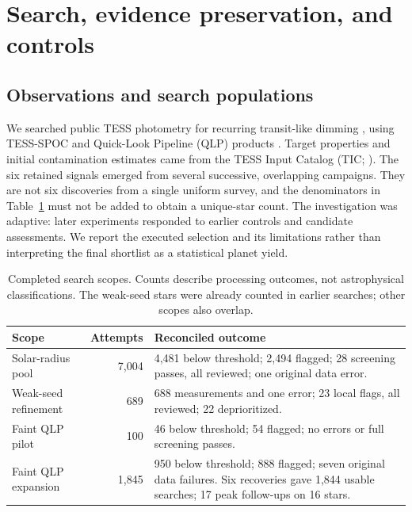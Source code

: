 \section{Search, evidence preservation, and controls}
\label{sec:methods}

\subsection{Observations and search populations}

We searched public TESS photometry for recurring transit-like dimming
\cite{ricker2015}, using TESS-SPOC and Quick-Look Pipeline (QLP) products
\cite{caldwell2020,huang2020}. Target properties and initial contamination
estimates came from the TESS Input Catalog (TIC; \cite{tic2019}). The six
retained signals emerged from several successive, overlapping campaigns.
They are not six discoveries from a single uniform survey, and the denominators
in Table~\ref{tab:campaigns} must not be added to obtain a unique-star count.
The investigation was adaptive: later experiments responded to earlier
controls and candidate assessments. We report the executed selection and
its limitations rather than interpreting the final shortlist as a statistical
planet yield.

\begin{table}[htbp]
\centering
\small
\caption{Completed search scopes. Counts describe processing outcomes,
not astrophysical classifications. The weak-seed stars were already counted
in earlier searches; other scopes also overlap.}
\label{tab:campaigns}
\begin{tabularx}{\linewidth}{@{}l r X@{}}
\toprule
Scope & Attempts & Reconciled outcome \\
\midrule
Solar-radius pool & 7,004 & 4,481 below threshold; 2,494 flagged;
28 screening passes, all reviewed; one original data error. \\
Weak-seed refinement & 689 & 688 measurements and one error;
23 local flags, all reviewed; 22 deprioritized. \\
Faint QLP pilot & 100 & 46 below threshold; 54 flagged; no errors
or full screening passes. \\
Faint QLP expansion & 1,845 & 950 below threshold; 888 flagged;
seven original data failures. Six recoveries gave 1,844 usable searches;
17 peak follow-ups on 16 stars. \\
\bottomrule
\end{tabularx}
\end{table}


